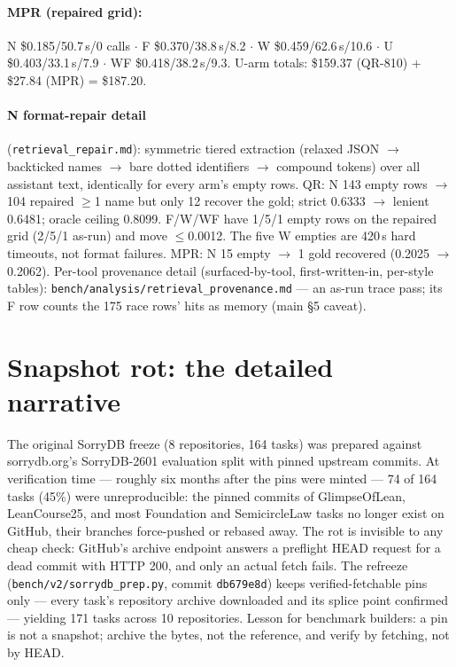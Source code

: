 \documentclass[10pt]{article}
\newcommand{\code}[1]{\texttt{#1}}
\begin{document}
\paragraph{MPR (repaired grid):} N \$0.185/50.7\,s/0 calls $\cdot$ F
\$0.370/38.8\,s/8.2 $\cdot$ W \$0.459/62.6\,s/10.6 $\cdot$ U
\$0.403/33.1\,s/7.9 $\cdot$ WF \$0.418/38.2\,s/9.3. U-arm totals:
\$159.37 (QR-810) + \$27.84 (MPR) = \$187.20.

\paragraph{N format-repair detail} (\code{retrieval\_repair.md}):
symmetric tiered extraction (relaxed JSON $\to$ backticked names $\to$
bare dotted identifiers $\to$ compound tokens) over all assistant
text, identically for every arm's empty rows. QR: N 143 empty rows
$\to$ 104 repaired $\geq$1 name but only 12 recover the gold; strict
0.6333 $\to$ lenient 0.6481; oracle ceiling 0.8099. F/W/WF have 1/5/1
empty rows on the repaired grid (2/5/1 as-run) and move
$\leq$0.0012. The five W empties are 420\,s hard timeouts, not format
failures. MPR: N 15 empty $\to$ 1 gold recovered (0.2025 $\to$
0.2062). Per-tool provenance detail (surfaced-by-tool,
first-written-in, per-style tables):
\code{bench/analysis/retrieval\_provenance.md} --- an as-run trace
pass; its F row counts the 175 race rows' hits as memory (main \S 5
caveat).

\section{Snapshot rot: the detailed narrative}\label{s7}

The original SorryDB freeze (8 repositories, 164 tasks) was prepared
against sorrydb.org's SorryDB-2601 evaluation split with pinned
upstream commits. At verification time --- roughly six months after
the pins were minted --- 74 of 164 tasks (45\%) were unreproducible:
the pinned commits of GlimpseOfLean, LeanCourse25, and most Foundation
and SemicircleLaw tasks no longer exist on GitHub, their branches
force-pushed or rebased away. The rot is invisible to any cheap check:
GitHub's archive endpoint answers a preflight HEAD request for a dead
commit with HTTP 200, and only an actual fetch fails. The refreeze
(\code{bench/v2/sorrydb\_prep.py}, commit \code{db679e8d}) keeps
verified-fetchable pins only --- every task's repository archive
downloaded and its splice point confirmed --- yielding 171 tasks
across 10 repositories. Lesson for benchmark builders: a pin is not a
snapshot; archive the bytes, not the reference, and verify by
fetching, not by HEAD.
\end{document}
